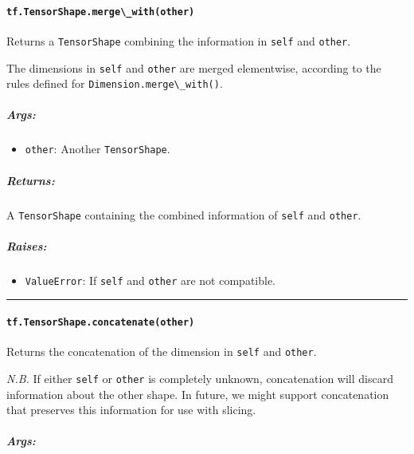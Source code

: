 \paragraph{\texorpdfstring{\lstinline{tf.TensorShape.merge\_with(other)}
}{tf.TensorShape.merge\_with(other) }}\label{tf.tensorshape.mergeux5fwithother}

Returns a \lstinline{TensorShape} combining the information in
\lstinline{self} and \lstinline{other}.

The dimensions in \lstinline{self} and \lstinline{other} are merged
elementwise, according to the rules defined for
\lstinline{Dimension.merge\_with()}.

\subparagraph{Args: }\label{args-30}

\begin{itemize}
\tightlist
\item
  \lstinline{other}: Another \lstinline{TensorShape}.
\end{itemize}

\subparagraph{Returns: }\label{returns-31}

A \lstinline{TensorShape} containing the combined information of
\lstinline{self} and \lstinline{other}.

\subparagraph{Raises: }\label{raises-17}

\begin{itemize}
\tightlist
\item
  \lstinline{ValueError}: If \lstinline{self} and \lstinline{other} are not
  compatible.
\end{itemize}

\begin{center}\rule{0.5\linewidth}{\linethickness}\end{center}

\paragraph{\texorpdfstring{\lstinline{tf.TensorShape.concatenate(other)}
}{tf.TensorShape.concatenate(other) }}\label{tf.tensorshape.concatenateother}

Returns the concatenation of the dimension in \lstinline{self} and
\lstinline{other}.

\emph{N.B.} If either \lstinline{self} or \lstinline{other} is completely
unknown, concatenation will discard information about the other shape.
In future, we might support concatenation that preserves this
information for use with slicing.

\subparagraph{Args: }\label{args-31}

